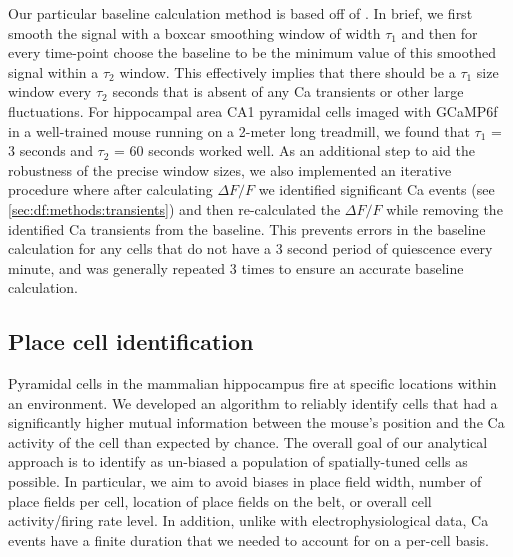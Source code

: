 Our particular baseline calculation method is based off of \citet{Jia2011}.
In brief, we first smooth the signal with a boxcar smoothing window of width $\tau_1$ and then for every time-point choose the baseline to be the minimum value of this smoothed signal within a $\tau_2$ window.
This effectively implies that there should be a $\tau_1$ size window every $\tau_2$ seconds that is absent of any Ca transients or other large fluctuations.
For hippocampal area CA1 pyramidal cells imaged with GCaMP6f in a well-trained mouse running on a 2-meter long treadmill, we found that $\tau_1$ = 3 seconds and $\tau_2$ = 60 seconds worked well.
As an additional step to aid the robustness of the precise window sizes, we also implemented an iterative procedure where after calculating $\Delta F/F$ we identified significant Ca events (see \autoref{sec:df:methods:transients}) and then re-calculated the $\Delta F/F$ while removing the identified Ca transients from the baseline.
This prevents errors in the baseline calculation for any cells that do not have a 3 second period of quiescence every minute, and was generally repeated 3 times to ensure an accurate baseline calculation.

\subsection{Place cell identification}
\label{sec:intro:techniques:pc_id}
Pyramidal cells in the mammalian hippocampus fire at specific locations within an environment.
We developed an algorithm to reliably identify cells that had a significantly higher mutual information between the mouse's position and the Ca activity of the cell than expected by chance.
The overall goal of our analytical approach is to identify as un-­biased a population of spatially-­tuned cells as possible.
In particular, we aim to avoid biases in place  field width, number of place fields per cell, location of place fields on the belt, or overall cell activity/firing rate level.
In addition, unlike with electrophysiological data, Ca events have a finite duration that we needed to account for on a per-­cell basis.  

